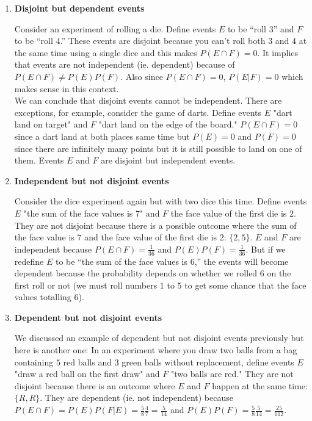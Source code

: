 \documentclass[12pt, a4paper]{article}
\newcounter{exa}
\begin{document}
\begin{enumerate}
  \item \textbf{Disjoint but dependent events}

Consider an experiment of rolling a die. Define events $E$ to be ``roll $3$'' and $F$ to be ``roll $4$.'' These events are disjoint because you can't roll both $3$ and $4$ at the same time using a single dice and this makes $P(E \cap F)=0$. It implies that events are not independent (ie. dependent) because of $P(E \cap F) \ne P(E)P(F)$. Also since $P(E \cap F)=0$, $P(E|F)=0$ which makes sense in this context. \\ 

We can conclude that disjoint events cannot be independent. There are exceptions, for example, consider the game of darts. Define events $E$ "dart land on target" and $F$ "dart land on the edge of the board." $P(E\cap F)=0$ since a dart land at both places same time but $P(E)=0$ and $P(F)=0$ since there are infinitely many points but it is still possible to land on one of them. Events $E$ and $F$ are disjoint but independent events.
  \item \textbf{Independent but not disjoint events}

Consider the dice experiment again but with two dice this time. Define events $E$ "the sum of the face values is $7$" and $F$ the face value of the first die is $2$. They are not disjoint because there is a possible outcome where the sum of the face value is $7$ and the face value of the first die is $2$: $\{2, 5\}$. $E$ and $F$ are independent because $P(E\cap F)=\frac{1}{36}$ and $P(E)P(F)=\frac{1}{36}$. But if we redefine $E$ to be ``the sum of the face values is $6$,'' the events will become dependent because the probability depends on whether we rolled $6$ on the first roll or not (we must roll numbers $1$ to $5$ to get some chance that the face values totalling $6$).
  \item \textbf{Dependent but not disjoint events}

We discussed an example of dependent but not disjoint events previously but here is another one: In an experiment where you draw two balls from a bag containing $5$ red balls and $3$ green balls without replacement, define events $E$ "draw a red ball on the first draw" and $F$ "two balls are red." They are not disjoint because there is an outcome where $E$ and $F$ happen at the same time: $\{R, R\}$. They are dependent (ie. not independent) because $P(E\cap F)=P(E)P(F|E)=\frac58 \frac47=\frac{5}{14}$ and $P(E)P(F)=\frac58 \frac{5}{14}=\frac{25}{112}$.
\end{enumerate}
\end{document}
